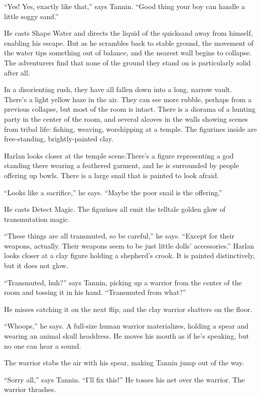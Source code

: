 \documentclass[smalldemyvopaper,11pt,twoside,onecolumn,openright,extrafontsizes]{memoir}
\begin{document}
``Yes! Yes, exactly like that,'' says Tannin. ``Good thing your boy can
handle a little soggy sand.''

He casts Shape Water and directs the liquid of the quicksand away from
himself, enabling his escape. But as he scrambles back to stable ground,
the movement of the water tips something out of balance, and the nearest
wall begins to collapse. The adventurers find that none of the ground
they stand on is particularly solid after all.

In a disorienting rush, they have all fallen down into a long, narrow
vault. There's a light yellow haze in the air. They can see more rubble,
perhaps from a previous collapse, but most of the room is intact. There
is a diorama of a hunting party in the center of the room, and several
alcoves in the walls showing scenes from tribal life: fishing, weaving,
worshipping at a temple. The figurines inside are free-standing,
brightly-painted clay.

Harlan looks closer at the temple scene.There's a figure representing a
god standing there wearing a feathered garment, and he is surrounded by
people offering up bowls. There is a large snail that is painted to look
afraid.

``Looks like a sacrifice,'' he says. ``Maybe the poor snail is the
offering.''

He casts Detect Magic. The figurines all emit the telltale golden glow
of transmutation magic.

``These things are all transmuted, so be careful,'' he says. ``Except
for their weapons, actually. Their weapons seem to be just little dolls'
accessories.'' Harlan looks closer at a clay figure holding a shepherd's
crook. It is painted distinctively, but it does not glow.

``Transmuted, huh?'' says Tannin, picking up a warrior from the center
of the room and tossing it in his hand. ``Transmuted from what?''

He misses catching it on the next flip, and the clay warrior shatters on
the floor.

``Whoops,'' he says. A full-size human warrior materializes, holding a
spear and wearing an animal skull headdress. He moves his mouth as if
he's speaking, but no one can hear a sound.

The warrior stabs the air with his spear, making Tannin jump out of the
way.

``Sorry all,'' says Tannin. ``I'll fix this!'' He tosses his net over
the warrior. The warrior thrashes.
\end{document}
